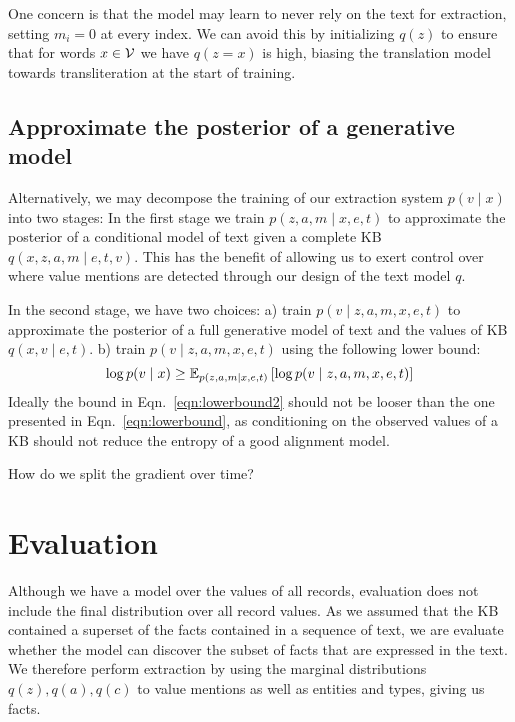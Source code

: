 \documentclass[12pt]{article}
\begin{document}
One concern is that the model may learn to never rely on the text for extraction,
setting $m_i = 0$ at every index.
We can avoid this by initializing $q(z)$ to ensure that for words $x \in \mathcal{V}$ 
we have $q(z = x)$ is high, biasing the translation model towards transliteration
at the start of training.

\subsection{Approximate the posterior of a generative model}
Alternatively, we may decompose the training of our extraction system $p(v\mid x)$ into two stages:
In the first stage we train $p(z,a,m\mid x,e,t)$ to approximate the posterior
of a conditional model of text given a complete KB $q(x,z,a,m \mid e,t,v)$.
This has the benefit of allowing us to exert control over where value mentions are detected
through our design of the text model $q$.

In the second stage, we have two choices:
a) train $p(v \mid z,a,m,x,e,t)$ to approximate the posterior of a full generative model of text and
the values of KB $q(x,v\mid e,t)$.
b) train $p(v \mid z,a,m,x,e,t)$ using the following lower bound:
\begin{equation}
\label{eqn:lowerbound2}
\log p(v\mid x) \geq
\mathbb{E}_{p(z,a,m\mid x,e,t)}\left[\log p(v\mid z,a,m, x,e,t)\right]
\end{equation}
Ideally the bound in Eqn.~\ref{eqn:lowerbound2}
should not be looser than the one presented in Eqn.~\ref{eqn:lowerbound},
as conditioning on the observed values of a KB should not reduce the entropy of
a good alignment model.

How do we split the gradient over time?

\section{Evaluation}
Although we have a model over the values of all records,
evaluation does not include the final distribution over all record values.
As we assumed that the KB contained a superset of the facts contained in
a sequence of text, we are evaluate whether the model can discover the subset of facts that 
are expressed in the text.
We therefore perform extraction by using the marginal distributions
$q(z),q(a),q(c)$ to value mentions as well as entities and types,
giving us facts.



\end{document}
